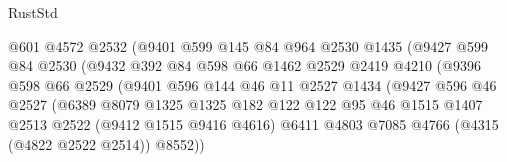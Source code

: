 \begin{lexlean}{RustStd}
\begin{coremodule}
                              @601
                              @4572
                              @2532
                              (@9401
                                @599
                                @145
                                @84
                                @964
                                @2530
                                @1435
                                (@9427
                                  @599
                                  @84
                                  @2530
                                  (@9432
                                    @392
                                    @84
                                    @598
                                    @66
                                    @1462
                                    @2529
                                    @2419
                                    @4210
                                    (@9396
                                      @598
                                      @66
                                      @2529
                                      (@9401
                                        @596
                                        @144
                                        @46
                                        @11
                                        @2527
                                        @1434
                                        (@9427
                                          @596
                                          @46
                                          @2527
                                          (@6389
                                            @8079
                                            @1325
                                            @1325
                                            @182
                                            @122
                                            @122
                                            @95
                                            @46
                                            @1515
                                            @1407
                                            @2513
                                            @2522
                                            (@9412 @1515 @9416 @4616)
                                            @6411
                                            @4803
                                            @7085
                                            @4766
                                            (@4315 (@4822 @2522 @2514))
                                            @8552))

\end{coremodule}
\end{lexlean}
